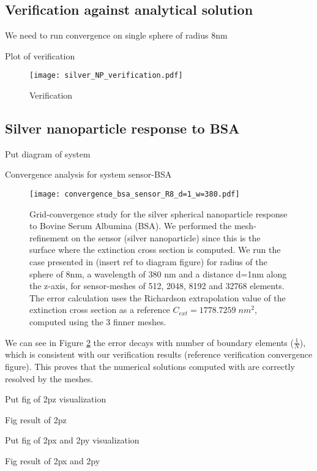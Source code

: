 
\subsection{Verification against analytical solution} \label{sec:verification}

We need to run convergence on single sphere of radius 8nm

Plot of verification

\begin{figure}[h] %
   \centering
   \texttt{[image: silver\_NP\_verification.pdf]} 
   \caption{Verification}
   \label{fig:verif_sphere}
\end{figure}

\subsection{Silver nanoparticle response to BSA} \label{sec:verification}

Put diagram of system

Convergence analysis for system sensor-BSA


\begin{figure}[h] %
   \centering
   \texttt{[image: convergence\_bsa\_sensor\_R8\_d=1\_w=380.pdf]} 
   \caption{Grid-convergence study for the silver spherical nanoparticle response to Bovine Serum Albumina (BSA). We performed
            the mesh-refinement on the sensor (silver nanoparticle) since this is the surface where the extinction cross section 
            is computed. We run the case presented in (insert ref to diagram figure) for radius of the sphere of 8nm, a wavelength
            of  380 nm and a distance d=1nm along the z-axis, for sensor-meshes of 512, 2048, 8192 and 32768 elements. The error 
            calculation uses the Richardson extrapolation value of the extinction cross section as a reference $C_{ext} = 1778.7259 \; nm^2$, 
            computed using the 3 finner meshes.}
   \label{fig:error_sphere-bsa}
\end{figure}


We can see in Figure \ref{fig:error_sphere-bsa} the error decays with number of boundary elements ($\frac{1}{N}$), which is consistent with our verification 
results (reference verification convergence figure). This proves that the numerical solutions computed with \pygbe are correctly resolved by the meshes. 


Put fig of 2pz visualization

Fig result of 2pz

Put fig of 2px and 2py visualization

Fig result of 2px and 2py


